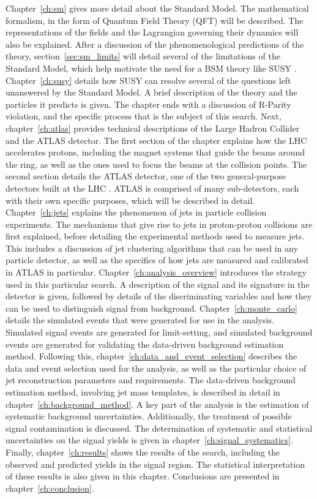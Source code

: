 Chapter~\ref{ch:sm} gives more detail about the Standard Model.
The mathematical formalism, in the form of Quantum Field Theory (QFT) will be described.
The representations of the fields and the Lagrangian governing their dynamics will also be explained.
After a discussion of the phenomenological predictions of the theory, section~\ref{sec:sm_limits} will detail several of the limitations of the Standard Model, which help motivate the need for a BSM theory like SUSY .
Chapter~\ref{ch:susy} details how SUSY can resolve several of the questions left unanswered by the Standard Model.
A brief description of the theory and the particles it predicts is given.
The chapter ends with a discussion of R-Parity violation, and the specific process that is the subject of this search.
Next, chapter~\ref{ch:atlas} provides technical descriptions of the Large Hadron Collider and the ATLAS detector.
The first section of the chapter explains how the LHC accelerates protons, including the magnet systems that guide the beams around the ring, as well as the ones used to focus the beams at the collision points.
The second section details the ATLAS detector, one of the two general-purpose detectors built at the LHC .
ATLAS is comprised of many sub-detectors, each with their own specific purposes, which will be described in detail.
Chapter~\ref{ch:jets} explains the phenomenon of jets in particle collision experiments.
The mechanisms that give rise to jets in proton-proton collisions are first explained, before detailing the experimental methods used to measure jets.
This includes a discussion of jet clustering algorithms that can be used in any particle detector, as well as the specifics of how jets are measured and calibrated in ATLAS in particular.
Chapter~\ref{ch:analysis_overview} introduces the strategy used in this particular search.
A description of the signal and its signature in the detector is given, followed by details of the discriminating variables and how they can be used to distinguish signal from background.
Chapter~\ref{ch:monte_carlo} details the simulated events that were generated for use in the analysis.
Simulated signal events are generated for limit-setting, and simulated background events are generated for validating the data-driven background estimation method.
Following this, chapter~\ref{ch:data_and_event_selection} describes the data and event selection used for the analysis, as well as the particular choice of jet reconstruction parameters and requirements.
The data-driven background estimation method, involving jet mass templates, is described in detail in chapter~\ref{ch:background_method}.
A key part of the analysis is the estimation of systematic background uncertainties.
Additionally, the treatment of possible signal contamination is discussed.
The determination of systematic and statistical uncertainties on the signal yields is given in chapter~\ref{ch:signal_systematics}.
Finally, chapter~\ref{ch:results} shows the results of the search, including the observed and predicted yields in the signal region.
The statistical interpretation of these results is also given in this chapter.
Conclusions are presented in chapter~\ref{ch:conclusion}.
